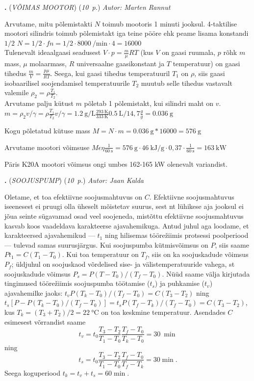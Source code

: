 \documentclass[11pt,a5paper]{article}
\newcommand{\numb}[1]{\vspace{5pt}\textbf{\large #1}}
\newcommand{\nimi}[1]{(\textsl{\small #1})}
\newcommand{\punktid}[1]{(\emph{#1~p.})}
\newcounter{ylesanne}
\newcommand{\yl}[1]{\addtocounter{ylesanne}{1}\numb{\theylesanne.} \nimi{#1} \newblock{}}
\newcommand{\autor}[1]{\emph{ Autor: #1}}%
\begin{document}
\newpage

\yl{VÕIMAS MOOTOR}
\punktid{10} \autor{Marten Rannut}

Arvutame, mitu põlemistakti $N$ toimub mootoris 1 minuti jooksul. 4-taktilise mootori silindris toimub põlemistakt iga teine pööre ehk peame lisama konstandi $1/2$
$N = 1/2\cdot f n = 1/2\cdot \SI{8000}{\per\minute}\cdot 4= 16000$\\
Tulenevalt ideaalgaasi seadusest $V \cdot p = \frac{m}{\mu}RT$ (kus $V$ on gaasi ruumala, $p$ rõhk $m$ mass, $\mu$ molaarmass, $R$ universaalne gaasikonstant ja $T$ temperatuur) on gaasi tihedus $\frac{m}{V} = \frac{p\mu}{RT}$. Seega, kui gaasi tihedus temperatuuril $T_1$ on $\rho$, siis gaasi isobaarilisel soojendamisel temperatuurile $T_2$ muutub selle tihedus vastavalt valemile $\rho_2 = \rho \frac{T_1}{T_2}$. \\
Arvutame palju kütust $m$ põletab 1 põlemistakt, kui silindri maht on $v$.
$m = \rho_2v /\gamma  = \rho \frac{T_1}{T_2}v /\gamma  = \SI{1,2}{\gram\per\liter} \frac{\SI{293}{\kelvin}}{\SI{333}{\kelvin}} \SI{0,5}{\liter} / 14,7 \frac{g}{g} = \SI{0,036}{\gram}$

Kogu põletatud kütuse mass $M = N\cdot m = \SI{0,036}{\gram} * 16000 = \SI{576}{\gram}$

Arvutame mootori võimsuse  
$M \epsilon \eta \frac{1}{\SI{60}{\second}} = \SI{576}{\gram}\cdot\SI{46}{\kilo\joule\per\gram}\cdot 0,37\cdot \frac{1}{\SI{60}{\second}}=\SI{163}{\kilo\watt}$ 

Päris K20A mootori võimsus ongi umbes 162-165 kW olenevalt variandist.


\yl{SOOJUSPUMP}
\punktid{10} \autor{Jaan Kalda}

Oletame, et toa efektiivne soojusmahtuvus on $C$. Efektiivne soojusmahtuvus iseenesest ei pruugi olla üheselt mõistetav suurus, sest nt lühikese aja jooksul ei jõua seinte sügavamad osad veel soojeneda, mistõttu efektiivne soojusmahtuvus kasvab koos vaadeldava karakteerse ajavahemikuga. Antud juhul aga loodame, et karakteersed ajavahemikud --- $t_1$ ning hilisemas töörežiimis protsessi poolperiood --- tulevad samas suurusjärgus. Kui soojuspumba kütmisvõimsus on $P$, siis saame $Pt_1=C(T_1-T_0)$. Kui toa temperatuur on $T_f$, siis on ka soojuskadude võimsus $P_f$; üldjuhul on soojuskaod võrdelised sise- ja välistemperatuuride vahega, st soojuskadude võimsus $P_s=P(T-T_0)/(T_f-T_0)$. Nüüd saame välja kirjutada tingimused töörežiimis soojuspumba töötamise ($t_s$) ja puhkamise ($t_v$) ajavahemilke jaoks: $t_vP(T_k-T_0)/(T_f-T_0)=C(T_3-T_2)$ ning $t_s[P-P(T_k-T_0)/(T_f-T_0)]=t_sP(T_f-T_k)/(T_f-T_0)=C(T_3-T_2)$, kus $T_k=(T_3+T_2)/2=\SI{22}\celsius$ on toa keskmine temperatuur. Asendades $C$ esimesest võrrandist saame $$t_v=t_0\frac{T_3-T_2}{T_1-T_0}\frac{T_f-T_0}{T_k-T_0}=\SI{30}{\min}$$ ning $$t_s=t_0\frac{T_3-T_2}{T_1-T_0}\frac{T_f-T_0}{T_f-T_k}=\SI{30}\min.$$ Seega koguperiood $t_k=t_v+t_s=\SI{60}\min$.
\end{document}
